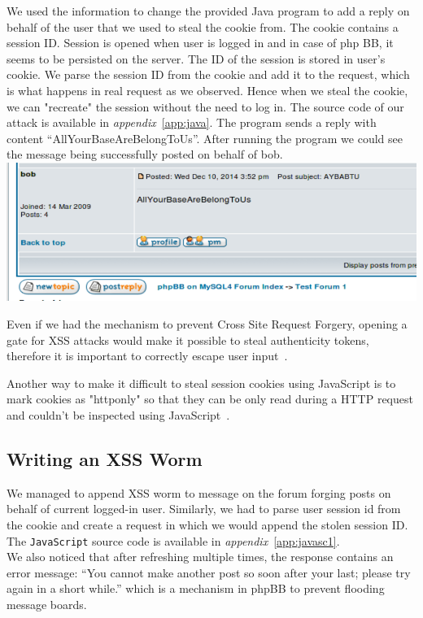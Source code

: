 \documentclass[12pt, a4paper, pdflatex]{article}
\begin{document}
We used the information to change the provided Java program to add a reply on behalf of the user that we used to steal the cookie from. The cookie contains a session ID. Session is opened when user is logged in and in case of php BB, it seems to be persisted on the server. The ID of the session is stored in user's cookie. We parse the session ID from the cookie and add it to the request, which is what happens in real request as we observed. Hence when we steal the cookie, we can "recreate" the session without the need to log in. The source code of our attack is available in \emph{appendix}~\ref{app:java}. The program sends a reply with content ``AllYourBaseAreBelongToUs''. After running the program we could see the message being successfully posted on behalf of bob.\\

\includegraphics[width=.95\textwidth]{gfx/xss/task4-attack-done.png}

Even if we had the mechanism to prevent Cross Site Request Forgery, opening a gate for XSS attacks would make it possible to steal authenticity tokens, therefore it is important to correctly escape user input~\cite{csrf}.

Another way to make it difficult to steal session cookies using JavaScript is to mark cookies as "httponly" so that they can be only read during a HTTP request and couldn't be inspected using JavaScript~\cite{httponly}.

\subsection{Writing an XSS Worm}
We managed to append XSS worm to message on the forum forging posts on behalf of current logged-in user. Similarly, we had to parse user session id from the cookie and create a request in which we would append the stolen session ID. The \texttt{JavaScript} source code is available in \emph{appendix}~\ref{app:javasc1}.\\

We also noticed that after refreshing multiple times, the response contains an error message: ``You cannot make another post so soon after your last; please try again in a short while.'' which is a mechanism in phpBB to prevent flooding message boards.
\end{document}
